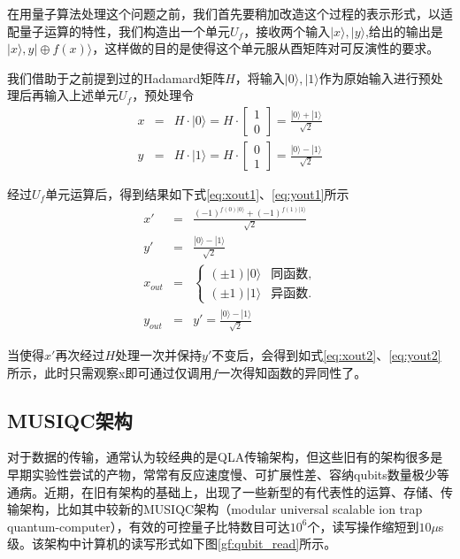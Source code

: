 \documentclass[UTF8, 11pt, a4paper]{ctexart}
\begin{document}
在用量子算法处理这个问题之前，我们首先要稍加改造这个过程的表示形式，以适配量子运算的特性，我们构造出一个单元$U_f$，接收两个输入$|x\rangle,|y\rangle$,给出的输出是$|x\rangle,y|\oplus f(x)\rangle$，这样做的目的是使得这个单元服从酉矩阵对可反演性的要求。

我们借助于之前提到过的Hadamard矩阵$H$，将输入$|0\rangle,|1\rangle$作为原始输入进行预处理后再输入上述单元$U_f$，预处理令
\begin{eqnarray}
x &=& H \cdot |0\rangle = H \cdot \left[\begin{array}{c}1 \\0\end{array}\right]=\frac{|0\rangle + |1\rangle}{\sqrt{2}} \\
y & = & H \cdot |1\rangle = H \cdot \left[\begin{array}{c}0 \\1\end{array}\right]=\frac{|0\rangle - |1\rangle}{\sqrt{2}}
\end{eqnarray}

经过$U_f$单元运算后，得到结果如下式\ref{eq:xout1}、\ref{eq:yout1}所示
\begin{eqnarray}
\label{eq:xout1}
x' & = & \frac{(-1)^{f(0)|0\rangle} + (-1)^{f(1)|1\rangle}}{\sqrt{2}} \\
\label{eq:yout1}
y' & = &  \frac{|0\rangle - |1\rangle}{\sqrt{2}}\\
\label{eq:xout2}
x_{out} &=& \begin{cases}
    (\pm 1) | 0\rangle  &  \text{同函数}, \\
    (\pm 1) | 1\rangle  &  \text{异函数}.
	\end{cases} \\
\label{eq:yout2}
y_{out} &=& y' = \frac{|0\rangle - |1\rangle}{\sqrt{2}}
\end{eqnarray}

当使得$x'$再次经过$H$处理一次并保持$y'$不变后，会得到如式\ref{eq:xout2}、\ref{eq:yout2}所示，此时只需观察x即可通过仅调用$f$一次得知函数的异同性了。


\subsection{MUSIQC架构}

对于数据的传输，通常认为较经典的是QLA传输架构\cite{qla}，但这些旧有的架构很多是早期实验性尝试的产物，常常有反应速度慢、可扩展性差、容纳qubits数量极少等通病。近期，在旧有架构的基础上，出现了一些新型的有代表性的运算、存储、传输架构，比如其中较新的MUSIQC架构\cite{largeq}（modular universal scalable ion trap quantum-computer），有效的可控量子比特数目可达$10^{6}$个，读写操作缩短到$10\mu$s级。该架构中计算机的读写形式如下图\ref{gf:qubit_read}所示。
\end{document}
